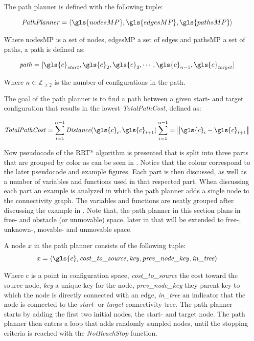 \textit{}\bs

The path planner is defined with the following tuple:

\[\mathit{Path Planner} = \left\langle \gls{nodesMP}, \gls{edgesMP}, \gls{pathsMP}\right\rangle\]

Where \gls{nodesMP} is a set of nodes, \gls{edgesMP} a set of edges and \gls{pathsMP} a set of paths, a path is defined as:

\[\mathit{path} = [\gls{c}_\mathit{start}, \gls{c}_2, \gls{c}_3, \cdots, \gls{c}_{n-1}, \gls{c}_\mathit{target}]\]

Where $n \in \mathbb{Z}_{\geq 2}$ is the number of configurations in the path.\bs

The goal of the path planner is to find a path between a given start- and target configuration that results in the lowest \textit{TotalPathCost}, defined as:\bs

\[\mathit{TotalPathCost} = \sum_{i=1}^{n-1} \mathit{Distance}(\gls{c}_i, \gls{c}_{i+1}) \sum_{i=1}^{n-1} = \left\|\gls{c}_i-\gls{c}_{i+1}\right\|\]

Now pseudocode of the \ac{RRT*} algorithm is presented that is split into three parts that are grouped by color as can be seen in . Notice that the colour correspond to the later pseudocode and example figures. Each part is then discussed, as well as a number of variables and functions used in that respected part. When discussing each part an example is analyzed in which the path planner adds a single node to the connectivity graph. The variables and functions are neatly grouped after discussing the example in . Note that, the path planner in this section plans in free- and obstacle (or unmovable) space, later in  that will be extended to free-, unknown-, movable- and unmovable space.\bs

A node $x$ in the path planner consists of the following tuple:\bs
\[x = \left\langle \gls{c}, \mathit{cost\_to\_source}, \mathit{key}, \mathit{prev\_node\_key}, \mathit{in\_tree} \right\rangle\]

Where \gls{c} is a point in configuration space, \textit{cost\_to\_source} the cost toward the source node, \textit{key} a unique key for the node, \textit{prev\_node\_key} they parent key to which the node is directly connected with an edge, \textit{in\_tree} an indicator that the node is connected to the \textit{start-} or \textit{target} connectivity tree. The path planner starts by adding the first two initial nodes, the start- and target node. The path planner then enters a loop that adds randomly sampled nodes, until the stopping criteria is reached with the \textit{NotReachStop} function.\bs

